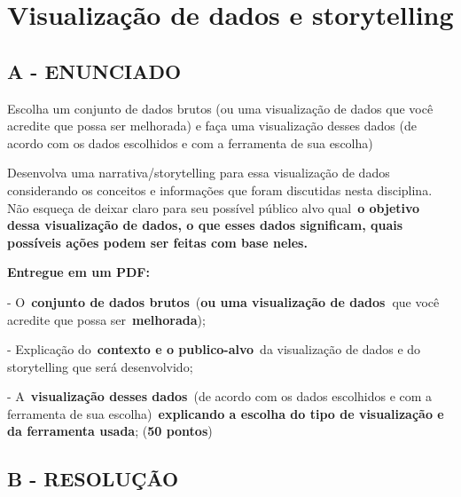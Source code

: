 \label{ap:ap14}
\chapter{Visualização de dados e storytelling}
\section*{\textbf{A - ENUNCIADO}}

\textcolor[HTML]{1D2125}{Escolha um conjunto de dados brutos (ou uma visualização de dados que você acredite que possa
ser melhorada) e faça uma visualização desses dados (de acordo com os dados escolhidos e com a ferramenta de sua
escolha)}

\textcolor[HTML]{1D2125}{Desenvolva uma narrativa/storytelling para essa visualização de dados considerando os conceitos
e informações que foram discutidas nesta disciplina. Não esqueça de deixar claro para seu possível público alvo
qual }\textbf{\textcolor[HTML]{1D2125}{o objetivo dessa visualização de dados, o que esses dados significam, quais
possíveis ações podem ser feitas com base neles.}}\textcolor[HTML]{1D2125}{ }

\textbf{\textcolor[HTML]{1D2125}{Entregue em um PDF:}}

\textcolor[HTML]{1D2125}{{}- O }\textbf{\textcolor[HTML]{1D2125}{conjunto de dados
brutos}}\textcolor[HTML]{1D2125}{ (}\textbf{\textcolor[HTML]{1D2125}{ou uma visualização de
dados }}\textcolor[HTML]{1D2125}{que você acredite que possa
ser }\textbf{\textcolor[HTML]{1D2125}{melhorada}}\textcolor[HTML]{1D2125}{);}

\textcolor[HTML]{1D2125}{{}- Explicação do }\textbf{\textcolor[HTML]{1D2125}{contexto e o
publico-alvo}}\textcolor[HTML]{1D2125}{ da visualização de dados e do storytelling que será desenvolvido;}

\textcolor[HTML]{1D2125}{{}- A }\textbf{\textcolor[HTML]{1D2125}{visualização desses
dados}}\textcolor[HTML]{1D2125}{ (de acordo com os dados escolhidos e com a ferramenta de sua
escolha) }\textbf{\textcolor[HTML]{1D2125}{explicando a escolha do tipo de visualização e da ferramenta
usada}}\textcolor[HTML]{1D2125}{; (}\textbf{\textcolor[HTML]{1D2125}{50 pontos}}\textcolor[HTML]{1D2125}{)}



\section*{\textbf{B - RESOLUÇÃO}}
